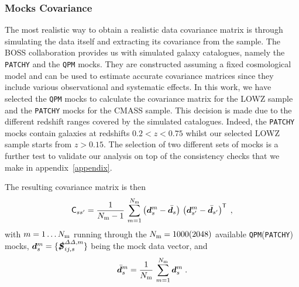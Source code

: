 \documentclass[astrosymb,twocolumn]{aastex631}
\begin{document}

\subsubsection{Mocks Covariance}
\label{subsec:Mock}
The most realistic way to obtain a realistic data covariance matrix is through simulating the data itself and extracting its covariance from the sample. The BOSS collaboration provides us with simulated galaxy catalogues, namely the \texttt{PATCHY} \citep{Kitaura2016} and the \texttt{QPM} \citep{Wang2017,White2013} mocks. They are constructed assuming a fixed cosmological model and can be used to estimate accurate covariance matrices since they include various observational and systematic effects. In this work, we have selected the \texttt{QPM} mocks to calculate the covariance matrix for the LOWZ sample and the \texttt{PATCHY} mocks for the CMASS sample. This decision is made due to the different redshift ranges covered by the simulated catalogues. Indeed, the \texttt{PATCHY} mocks contain galaxies at redshifts \(0.2<z<0.75\) whilst our selected LOWZ sample starts from \(z>0.15\). The selection of two different sets of mocks is a further test to validate our analysis on top of the consistency checks that we make in appendix~\ref{appendix}.

The resulting covariance matrix is then
\begin{equation}
{\mathsf C}_{ss^\prime}=\frac{1}{N_{\rm m}-1}\,\sum_{m=1}^{N_{\rm m}}\left(\bm d_s^m-\bar{\bm d}_s\right)\,\left(\bm d_{s^\prime}^m-\bar{\bm d}_{s^\prime}\right)^{\sf T}\;,
    \label{eq:mock_covmat}
\end{equation}
with \(m=1\ldots N_{\rm m}\) running through the \(N_{\rm m}=1000(2048)\) available \texttt{QPM}(\texttt{PATCHY}) mocks, \(\bm d_s^m=\{\bm{\slashed{S}}^{\varDelta\varDelta,m}_{ij,s}\}\) being the mock data vector, and 
\begin{equation}
\bar{\bm d}_s^m=\frac{1}{N_{\rm m}}\,\sum_{m=1}^{N_{\rm m}}\bm d_s^m\;.
    \label{eq:mock_average}
\end{equation}
\end{document}
